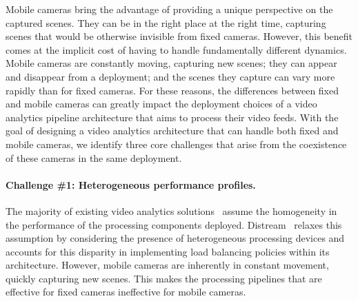 Mobile cameras bring the advantage of providing a unique perspective on the captured scenes. They can be in the right place at the right time, capturing scenes that would be otherwise invisible from fixed cameras. However, this benefit comes at the implicit cost of having to handle fundamentally different dynamics. Mobile cameras are constantly moving, capturing new scenes; they can appear and disappear from a deployment; and the scenes they capture can vary more rapidly than for fixed cameras. For these reasons, the differences between fixed and mobile cameras can greatly impact the deployment choices of a video analytics pipeline architecture that aims to process their video feeds. With the goal of designing a video analytics architecture that can handle both fixed and mobile cameras, we identify three core challenges that arise from the coexistence of these cameras in the same deployment.

\paragraph{Challenge \#1: Heterogeneous performance profiles.} 
The majority of existing video analytics solutions~\cite{jiang2018chameleon} assume the homogeneity in the performance of the processing components deployed. Distream~\cite{zeng2020distream} relaxes this assumption by considering the presence of heterogeneous processing devices and accounts for this disparity in implementing load balancing policies within its architecture. However, mobile cameras are inherently in constant movement, quickly capturing new scenes. This makes the processing pipelines that are effective for fixed cameras ineffective for mobile cameras.  

